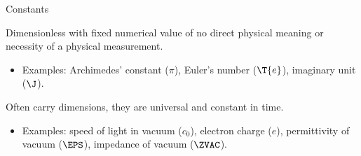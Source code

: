 \documentclass[xcolor=dvipsnames, aspectratio=169, handout, intlimits]{beamer}
\begin{document}
\begin{frame}{Constants}

\vspace{-0.5cm}
\begin{description}[mathematical]
	\item[mathematical] Dimensionless with fixed numerical value of no direct physical meaning or necessity of a physical measurement.
	\begin{itemize}
		\item<2-> Examples: Archimedes' constant ($\pi$), Euler's number ($\T{e}$), imaginary unit ($\J$).
	\end{itemize}
	\item[physical] Often carry dimensions, they are universal and constant in time.
	\begin{itemize}
		\item<2-> Examples: speed of light in vacuum ($c_0$), electron charge ($e$), permittivity of vacuum ($\EPS$), impedance of vacuum ($\ZVAC$).
	\end{itemize}
\end{description}

\vspace{0.25cm}

\end{frame}
\end{document}
